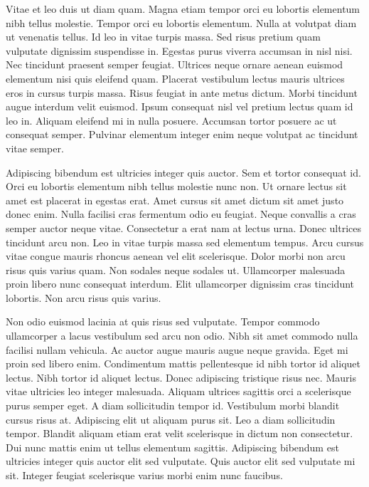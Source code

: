 \documentclass[11pt,a4paper]{article}
\begin{document}
Vitae et leo duis ut diam quam. Magna etiam tempor orci eu lobortis elementum nibh tellus molestie. Tempor orci eu lobortis elementum. Nulla at volutpat diam ut venenatis tellus. Id leo in vitae turpis massa. Sed risus pretium quam vulputate dignissim suspendisse in. Egestas purus viverra accumsan in nisl nisi. Nec tincidunt praesent semper feugiat. Ultrices neque ornare aenean euismod elementum nisi quis eleifend quam. Placerat vestibulum lectus mauris ultrices eros in cursus turpis massa. Risus feugiat in ante metus dictum. Morbi tincidunt augue interdum velit euismod. Ipsum consequat nisl vel pretium lectus quam id leo in. Aliquam eleifend mi in nulla posuere. Accumsan tortor posuere ac ut consequat semper. Pulvinar elementum integer enim neque volutpat ac tincidunt vitae semper.

Adipiscing bibendum est ultricies integer quis auctor. Sem et tortor consequat id. Orci eu lobortis elementum nibh tellus molestie nunc non. Ut ornare lectus sit amet est placerat in egestas erat. Amet cursus sit amet dictum sit amet justo donec enim. Nulla facilisi cras fermentum odio eu feugiat. Neque convallis a cras semper auctor neque vitae. Consectetur a erat nam at lectus urna. Donec ultrices tincidunt arcu non. Leo in vitae turpis massa sed elementum tempus. Arcu cursus vitae congue mauris rhoncus aenean vel elit scelerisque. Dolor morbi non arcu risus quis varius quam. Non sodales neque sodales ut. Ullamcorper malesuada proin libero nunc consequat interdum. Elit ullamcorper dignissim cras tincidunt lobortis. Non arcu risus quis varius.

Non odio euismod lacinia at quis risus sed vulputate. Tempor commodo ullamcorper a lacus vestibulum sed arcu non odio. Nibh sit amet commodo nulla facilisi nullam vehicula. Ac auctor augue mauris augue neque gravida. Eget mi proin sed libero enim. Condimentum mattis pellentesque id nibh tortor id aliquet lectus. Nibh tortor id aliquet lectus. Donec adipiscing tristique risus nec. Mauris vitae ultricies leo integer malesuada. Aliquam ultrices sagittis orci a scelerisque purus semper eget. A diam sollicitudin tempor id. Vestibulum morbi blandit cursus risus at. Adipiscing elit ut aliquam purus sit. Leo a diam sollicitudin tempor. Blandit aliquam etiam erat velit scelerisque in dictum non consectetur. Dui nunc mattis enim ut tellus elementum sagittis. Adipiscing bibendum est ultricies integer quis auctor elit sed vulputate. Quis auctor elit sed vulputate mi sit. Integer feugiat scelerisque varius morbi enim nunc faucibus.
\end{document}
